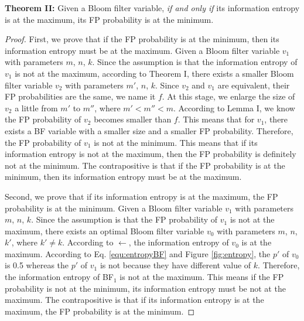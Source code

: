 \noindent\textbf{Theorem II:} Given a Bloom filter variable,  \textit{if and only if} its information entropy is at the maximum, its FP probability is at the minimum.

\begin{proof}
%
First, we prove that if the FP probability is at the minimum, then its information entropy must be at the maximum. 
%
Given a Bloom filter variable $v_1$ with parameters $m$, $n$, $k$. 
%
Since the assumption is that the information entropy of $v_1$ is not at the maximum, according to Theorem I, there exists a smaller Bloom filter variable $v_2$ with parameters $m'$, $n$, $k$. 
%
Since $v_2$ and $v_1$ are equivalent, their FP probabilities are the same, we name it $f$.
%
At this stage, we enlarge the size of $v_2$ a little from $m'$ to $m''$, where $m'<m''<m$. 
%
According to Lemma I, we know the FP probability of $v_2$ becomes smaller than $f$. 
%
This means that for $v_1$, there exists a BF variable with a smaller size and a smaller FP probability.
%
Therefore, the FP probability of $v_1$ is not at the minimum.
%
This means that if its information entropy is not at the maximum, then the FP probability is definitely not at the minimum. 
%
The contrapositive is that if the FP probability is at the minimum, then its information entropy must be at the maximum.

Second, we prove that if its information entropy is at the maximum, the FP probability is at the minimum.
%
Given a Bloom filter variable $v_1$ with parameters $m$, $n$, $k$. 
%
Since the assumption is that the FP probability of $v_1$ is not at the maximum, there exists an optimal Bloom filter variable $v_0$ with parameters $m$, $n$, $k'$, where $k'\neq k$. 
%
According to $\leftarrow$, the information entropy of $v_0$ is at the maximum. 
%
According to Eq. \ref{equ:entropyBF} and Figure \ref{fig:entropy}, the $p'$ of $v_0$ is 0.5 whereas the $p'$ of $v_1$ is not because they have different value of $k$. 
%
Therefore, the information entropy of BF$_1$ is not at the maximum.
%
This means if the FP probability is not at the minimum, its information entropy must be not at the maximum. 
%
The contrapositive is that if its information entropy is at the maximum, the FP probability is at the minimum.
\end{proof}

